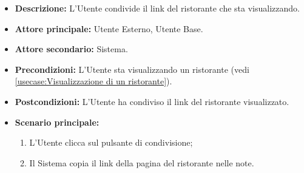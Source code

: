 \label{usecase:Condividi ristorante}
\begin{itemize}
    \item \textbf{Descrizione:} L'Utente condivide il link del ristorante che sta visualizzando.

    \item \textbf{Attore principale:} Utente Esterno, Utente Base.

    \item \textbf{Attore secondario:} Sistema.

    \item \textbf{Precondizioni:} L'Utente sta visualizzando un ristorante (vedi \autoref{usecase:Visualizzazione di un ristorante}).

    \item \textbf{Postcondizioni:} L'Utente ha condiviso il link del ristorante visualizzato.

    \item \textbf{Scenario principale:}
        \begin{enumerate}
            \item L'Utente clicca sul pulsante di condivisione;
            \item Il Sistema copia il link della pagina del ristorante nelle note.
        \end{enumerate}
\end{itemize}
